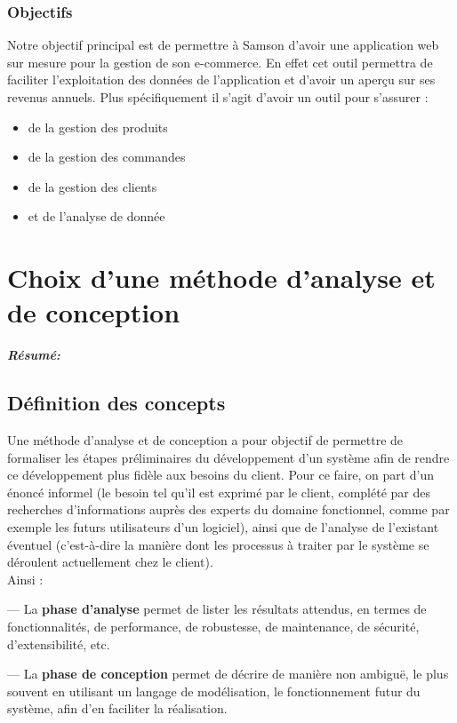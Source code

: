 \documentclass[a4paper, 12pt]{report}
\begin{document}
\subsection{Objectifs}
{Notre objectif principal est de permettre à Samson d’avoir une application web sur mesure pour la gestion de son e-commerce. En effet cet outil permettra de faciliter l’exploitation des données de l’application et d’avoir un aperçu sur ses revenus annuels. Plus spécifiquement il s’agit d’avoir un outil pour s’assurer :
\begin{itemize}
  \item de la gestion des produits 
  \item de la gestion des commandes
  \item de la gestion des clients
  \item et de l'analyse de donnée
\end{itemize} 
}

\chapter{ Choix d'une méthode d'analyse et de conception }
\textit{\textbf{Résumé:} }
\setcounter{minitocdepth}{1}
\minitoc

\section{Définition des concepts}
Une méthode d'analyse et de conception a pour objectif de permettre de formaliser les étapes préliminaires du développement d'un système afin de rendre ce développement plus fidèle aux besoins du client. Pour ce faire, on part d'un énoncé informel (le besoin tel qu'il est exprimé par le client, complété par des recherches d'informations auprès des experts du domaine fonctionnel, comme par exemple les futurs utilisateurs d'un logiciel), ainsi que de l'analyse de l'existant éventuel (c'est-à-dire la manière dont les processus à traiter par le système se déroulent actuellement chez le client). \\Ainsi :

 --- La  \textbf{phase d'analyse} permet de lister les résultats attendus, en termes de fonctionnalités, de performance, de robustesse, de maintenance, de sécurité, d'extensibilité, etc.
 
 --- La \textbf{phase de conception} permet de décrire de manière non ambiguë, le plus souvent en utilisant un langage de modélisation, le fonctionnement futur du système, afin d'en faciliter la réalisation.
\end{document}
